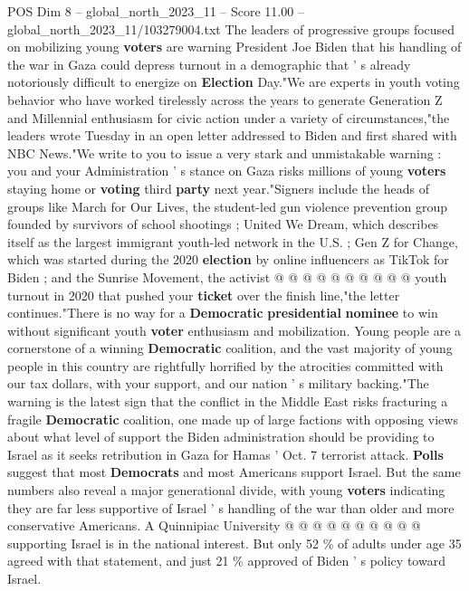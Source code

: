 \begin{textsample}{POS Dim 8 – global\_north\_2023\_11 – Score 11.00 – global\_north\_2023\_11/103279004.txt}  \label{ex:f8_pos_121}
The leaders of progressive groups focused on mobilizing young \textbf{voters} are warning President Joe Biden that his handling of the war in Gaza could depress turnout in a demographic that ' s already notoriously difficult to energize on \textbf{Election} Day."We are experts in youth voting behavior who have worked tirelessly across the years to generate Generation Z and Millennial enthusiasm for civic action under a variety of circumstances,"the leaders wrote Tuesday in an open letter addressed to Biden and first shared with NBC News."We write to you to issue a very stark and unmistakable warning : you and your Administration ' s stance on Gaza risks millions of young \textbf{voters} staying home or \textbf{voting} third \textbf{party} next year."Signers include the heads of groups like March for Our Lives, the student-led gun violence prevention group founded by survivors of school shootings ; United We Dream, which describes itself as the largest immigrant youth-led network in the U.S. ; Gen Z for Change, which was started during the 2020 \textbf{election} by online influencers as TikTok for Biden ; and the Sunrise Movement, the activist @ @ @ @ @ @ @ @ @ @ youth turnout in 2020 that pushed your \textbf{ticket} over the finish line,"the letter continues."There is no way for a \textbf{Democratic} \textbf{presidential} \textbf{nominee} to win without significant youth \textbf{voter} enthusiasm and mobilization.
Young people are a cornerstone of a winning \textbf{Democratic} coalition, and the vast majority of young people in this country are rightfully horrified by the atrocities committed with our tax dollars, with your support, and our nation ' s military backing."The warning is the latest sign that the conflict in the Middle East risks fracturing a fragile \textbf{Democratic} coalition, one made up of large factions with opposing views about what level of support the Biden administration should be providing to Israel as it seeks retribution in Gaza for Hamas ' Oct. 7 terrorist attack. \textbf{Polls} suggest that most \textbf{Democrats} and most Americans support Israel.
But the same numbers also reveal a major generational divide, with young \textbf{voters} indicating they are far less supportive of Israel ' s handling of the war than older and more conservative Americans.
A Quinnipiac University @ @ @ @ @ @ @ @ @ @ supporting Israel is in the national interest.
But only 52 \% of adults under age 35 agreed with that statement, and just 21 \% approved of Biden ' s policy toward Israel.

\end{textsample}
